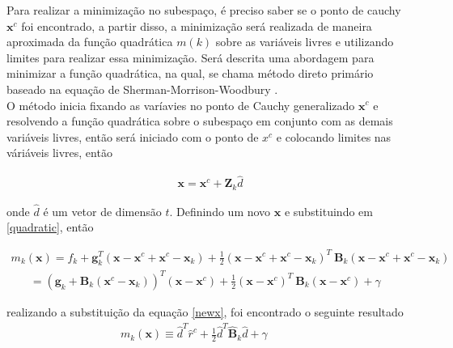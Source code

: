           Para realizar a minimização no subespaço, é preciso saber se o ponto de cauchy $\mathbf{x}^{c}$ foi encontrado, a partir disso, a minimização será realizada de maneira aproximada da função quadrática $m(k)$ sobre as variáveis livres e utilizando limites para realizar essa minimização. Será descrita uma abordagem para minimizar a função quadrática, na qual, se chama método direto primário baseado na equação de Sherman-Morrison-Woodbury \citep{sherman_morrison1950}\citep{woodbury1950}. \\
          
          O método inicia fixando as varíavies no ponto de Cauchy generalizado $\mathbf{x}^{c}$ e resolvendo a função quadrática sobre o subespaço em conjunto com as demais variáveis livres, então será iniciado com o ponto de $x^{c}$ e colocando limites nas váriáveis livres, então  
          
          \begin{eqnarray}
           \mathbf{x} = \mathbf{x}^{c} + \mathbf{Z}_{k} \hat{d}
           \label{newx}
          \end{eqnarray}

          
          onde $\hat{d}$ é um vetor de dimensão $t$. Definindo um novo $\mathbf{x}$ e substituindo em \ref{quadratic}, então 
          
          \begin{eqnarray}
          \nonumber
           m_{k} (\mathbf{x}) = f_{k} + \mathbf{g}_{k}^{T} (\mathbf{x}- \mathbf{x}^{c} + \mathbf{x}^{c} - \mathbf{x}_{k}) +\frac{1}{2} (\mathbf{x}-\mathbf{x}^{c}+ \mathbf{x}^{c} -\mathbf{x}_{k})^{T}~\mathbf{B}_{k}(\mathbf{x}-\mathbf{x}^{c}+ \mathbf{x}^{c} -\mathbf{x}_{k})
          \end{eqnarray}
          \vspace{-0.5cm}
          \begin{eqnarray}
           \nonumber
            = (\mathbf{g}_{k} + \mathbf{B}_{k} (\mathbf{x}^{c} -\mathbf{x}_{k}))^{T} (\mathbf{x}-\mathbf{x}^{c}) + \frac{1}{2} (\mathbf{x}- \mathbf{x}^{c})^{T}~\mathbf{B}_{k} (\mathbf{x}-\mathbf{x}^{c}) + \gamma~~~~
          \end{eqnarray}
          
          realizando a substituição da equação \ref{newx}, foi encontrado o seguinte resultado
          \begin{eqnarray}
        m_{k}(\mathbf{x})  \equiv \hat{d}^{T}\hat{r}^{c} +\frac{1}{2} \hat{d}^{T} \hat{\mathbf{B}}_{k} \hat{d} + \gamma~~~~~~~ ~~~~~ ~ 
          \end{eqnarray}


